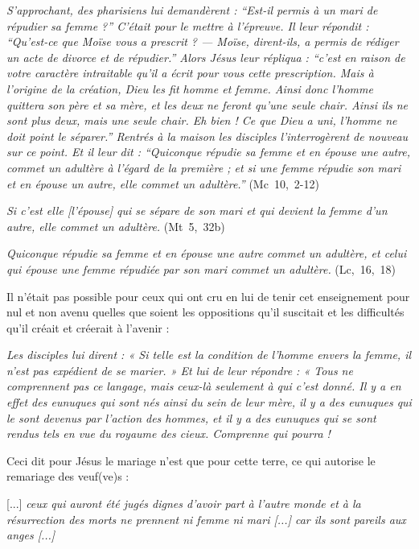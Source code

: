 \begin{displayquote}
\emph{S'approchant, des pharisiens lui demandèrent : \enquote{Est-il permis à un mari de répudier sa femme ?} C'était pour le mettre à l'épreuve. Il leur répondit : \enquote{Qu'est-ce que Moïse vous a prescrit ? --- Moïse, dirent-ils, a permis de rédiger un acte de divorce et de répudier.} Alors Jésus leur répliqua : \enquote{c'est en raison de votre caractère intraitable qu'il a écrit pour vous cette prescription. Mais à l'origine de la création, Dieu les fit homme et femme. Ainsi donc l'homme quittera son père et sa mère, et les deux ne feront qu'une seule chair. Ainsi ils ne sont plus deux, mais une seule chair. Eh bien ! Ce que Dieu a uni, l'homme ne doit point le séparer.} Rentrés à la maison les disciples l'interrogèrent de nouveau sur ce point. Et il leur dit : \enquote{Quiconque répudie sa femme et en épouse une autre, commet un adultère à l'égard de la première ; et si une femme répudie son mari et en épouse un autre, elle commet un adultère.}} (Mc~10,~2-12)

{\emph{Si c'est elle \emph{[l'épouse]} qui se sépare de son mari et qui devient la femme d'un autre, elle commet un adultère.}} (Mt~5,~32b)

{\emph{Quiconque répudie sa femme et en épouse une autre commet un adultère, et celui qui épouse une femme répudiée par son mari commet un adultère.}} (Lc,~16,~18)
 \end{displayquote} 

  Il n'était pas possible pour ceux qui ont cru en lui de tenir cet enseignement pour nul et non avenu quelles que soient les oppositions qu'il suscitait et les difficultés qu'il créait et créerait à l'avenir :

\begin{displayquote}[Mt~19,~10-12]
\emph{Les disciples lui dirent : « Si telle est la condition de l'homme envers la femme, il n'est pas expédient de se marier. » Et lui de leur répondre : « Tous ne comprennent pas ce langage, mais ceux-là seulement à qui c'est donné. Il y a en effet des eunuques qui sont nés ainsi du sein de leur mère, il y a des eunuques qui le sont devenus par l'action des hommes, et il y a des eunuques qui se sont rendus tels en vue du royaume des cieux. Comprenne qui pourra !}
\end{displayquote}
 
 Ceci dit pour Jésus le mariage n'est que pour cette terre, ce qui autorise le remariage des veuf(ve)s :

\begin{displayquote}[Luc 20, 34-36]

[...] \emph{ceux qui auront été jugés dignes d'avoir part à l'autre monde et à la résurrection des morts ne prennent ni femme ni mari \emph{[...]} car ils sont pareils aux anges \emph{[...]}}
\end{displayquote}

